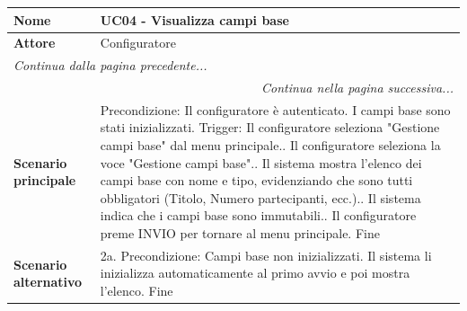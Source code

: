 \documentclass[12pt, a4paper, oneside]{report}
\begin{document}
\begin{tabularx}{\textwidth}{|l|X|}
    \hline
    \textbf{Nome}               & \textbf{UC04 - Visualizza campi base} \\ \hline
    \textbf{Attore}             & Configuratore \\ \hline
    \endfirsthead 

    \hline
    \multicolumn{2}{|l|}{\textit{Continua dalla pagina precedente...}} \\ \hline
    \endhead 

    \hline
    \multicolumn{2}{|r|}{\textit{Continua nella pagina successiva...}} \\ \hline
    \endfoot 

    \hline
    \endlastfoot

    \textbf{Scenario principale} & 
    Precondizione: Il configuratore è autenticato. I campi base sono stati inizializzati.\newline
    Trigger: Il configuratore seleziona "Gestione campi base" dal menu principale.\newline
    1. Il configuratore seleziona la voce "Gestione campi base".\newline
    2. Il sistema mostra l'elenco dei campi base con nome e tipo, evidenziando che sono tutti obbligatori (Titolo, Numero partecipanti, ecc.).\newline
    3. Il sistema indica che i campi base sono immutabili.\newline
    4. Il configuratore preme INVIO per tornare al menu principale.\newline
    Fine \\ \hline
    
    \textbf{Scenario alternativo} & 
    2a. Precondizione: Campi base non inizializzati.\newline
    Il sistema li inizializza automaticamente al primo avvio e poi mostra l'elenco.\newline
    Fine \\ \hline
\end{tabularx}

\renewcommand{\arraystretch}{1.4} 
\end{document}
